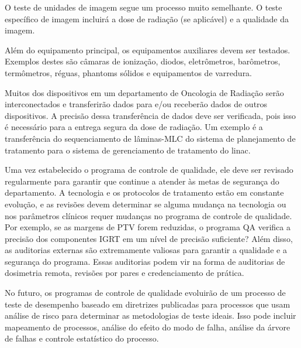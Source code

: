 \documentclass[11pt,a4paper]{article}
\newcounter{exemplo}
\begin{document}
	O teste de unidades de imagem segue um processo muito semelhante. O teste específico de imagem incluirá a dose de radiação (se aplicável) e a qualidade da imagem.

	Além do equipamento principal, os equipamentos auxiliares devem ser testados. Exemplos destes são câmaras de ionização, diodos, eletrômetros, barômetros, termômetros, réguas, phantoms sólidos e equipamentos de varredura.

	Muitos dos dispositivos em um departamento de Oncologia de Radiação serão interconectados e transferirão dados para e/ou receberão dados de outros dispositivos. A precisão dessa transferência de dados deve ser verificada, pois isso é necessário para a entrega segura da dose de radiação. Um exemplo é a transferência do sequenciamento de lâminas-MLC do sistema de planejamento de tratamento para o sistema de gerenciamento de tratamento do linac.

	Uma vez estabelecido o programa de controle de qualidade, ele deve ser revisado regularmente para garantir que continue a atender às metas de segurança do departamento. A tecnologia e os protocolos de tratamento estão em constante evolução, e as revisões devem determinar se alguma mudança na tecnologia ou nos parâmetros clínicos requer mudanças no programa de controle de qualidade. Por exemplo, se as margens de PTV forem reduzidas, o programa QA verifica a precisão dos componentes IGRT em um nível de precisão suficiente? Além disso, as auditorias externas são extremamente valiosas para garantir a qualidade e a segurança do programa. Essas auditorias podem vir na forma de auditorias de dosimetria remota, revisões por pares e credenciamento de prática.

	No futuro, os programas de controle de qualidade evoluirão de um processo de teste de desempenho baseado em diretrizes publicadas para processos que usam análise de risco para determinar as metodologias de teste ideais. Isso pode incluir mapeamento de processos, análise do efeito do modo de falha, análise da árvore de falhas e controle estatístico do processo.


\end{document}
